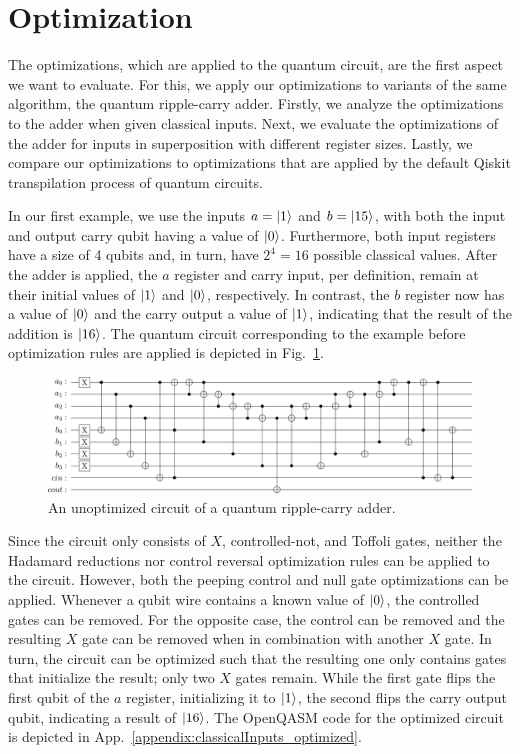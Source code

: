 \section{Optimization}
\label{sec:eval_optimization}
The optimizations, which are applied to the quantum circuit, are the first aspect we want to evaluate. For this, we apply our optimizations to variants of the same algorithm, the quantum ripple-carry adder. Firstly, we analyze the optimizations to the adder when given classical inputs. Next, we evaluate the optimizations of the adder for inputs in superposition with different register sizes. Lastly, we compare our optimizations to optimizations that are applied by the default Qiskit transpilation process of quantum circuits.

In our first example, we use the inputs $a = \ket{1}$ and $b = \ket{15}$, with both the input and output carry qubit having a value of $\ket{0}$. Furthermore, both input registers have a size of 4 qubits and, in turn, have $2^4 = 16$ possible classical values. After the adder is applied, the $a$ register and carry input, per definition, remain at their initial values of $\ket{1}$ and $\ket{0}$, respectively. In contrast, the $b$ register now has a value of $\ket{0}$ and the carry output a value of $\ket{1}$, indicating that the result of the addition is $\ket{16}$.
The quantum circuit corresponding to the example before optimization rules are applied is depicted in Fig.~\ref{fig:eval_adder_circuit}.
\begin{figure}[htp]
    \centering     
    \includegraphics[width=\textwidth]{../figures/images/adderCircuit.png}
    \caption{An unoptimized circuit of a quantum ripple-carry adder.}
    \label{fig:eval_adder_circuit}
\end{figure}

Since the circuit only consists of $X$, controlled-not, and Toffoli gates, neither the Hadamard reductions nor control reversal optimization rules can be applied to the circuit. However, both the peeping control and null gate optimizations can be applied. Whenever a qubit wire contains a known value of $\ket{0}$, the controlled gates can be removed. For the opposite case, the control can be removed and the resulting $X$ gate can be removed when in combination with another $X$ gate. In turn, the circuit can be optimized such that the resulting one only contains gates that initialize the result; only two $X$ gates remain. While the first gate flips the first qubit of the $a$ register, initializing it to $\ket{1}$, the second flips the carry output qubit, indicating a result of $\ket{16}$. The OpenQASM code for the optimized circuit is depicted in App.~\ref{appendix:classicalInputs_optimized}.

